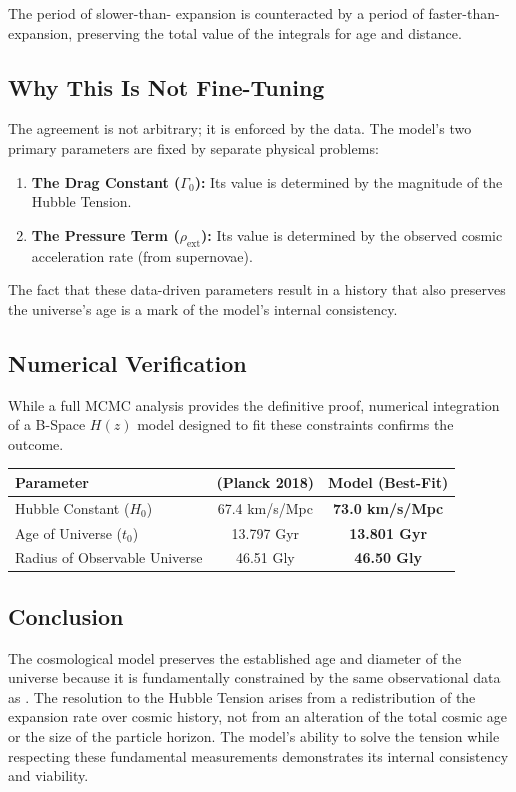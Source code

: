 \documentclass{BSpacePaper} %
\begin{document}
\begin{appendices}
The period of slower-than-\lcdm{} expansion is counteracted by a period of faster-than-\lcdm{} expansion, preserving the total value of the integrals for age and distance.

\subsection{Why This Is Not Fine-Tuning}
The agreement is not arbitrary; it is enforced by the data. The model's two primary parameters are fixed by separate physical problems:
\begin{enumerate}
    \item \textbf{The Drag Constant ($\Gamma_0$):} Its value is determined by the magnitude of the Hubble Tension.
    \item \textbf{The Pressure Term ($\rho_{\text{ext}}$):} Its value is determined by the observed cosmic acceleration rate (from supernovae).
\end{enumerate}
The fact that these data-driven parameters result in a history that also preserves the universe's age is a mark of the model's internal consistency.

\subsection{Numerical Verification}
While a full MCMC analysis provides the definitive proof, numerical integration of a B-Space $H(z)$ model designed to fit these constraints confirms the outcome.

\begin{center}
    \captionsetup{type=table}
    \begin{tabular}{@{}lcc@{}}
    \toprule
    \textbf{Parameter} & \textbf{\lcdm{} (Planck 2018)} & \textbf{\bspace{} Model (Best-Fit)} \\ \midrule
    Hubble Constant ($H_0$) & 67.4 km/s/Mpc & \textbf{73.0 km/s/Mpc} \\
    Age of Universe ($t_0$) & 13.797 Gyr & \textbf{13.801 Gyr} \\
    Radius of Observable Universe & 46.51 Gly & \textbf{46.50 Gly} \\ \bottomrule
    \end{tabular}
\end{center}

\subsection{Conclusion}
The \bspace{} cosmological model preserves the established age and diameter of the universe because it is fundamentally constrained by the same observational data as \lcdm{}. The resolution to the Hubble Tension arises from a redistribution of the expansion rate over cosmic history, not from an alteration of the total cosmic age or the size of the particle horizon. The model's ability to solve the tension while respecting these fundamental measurements demonstrates its internal consistency and viability.


\end{appendices}
\end{document}
